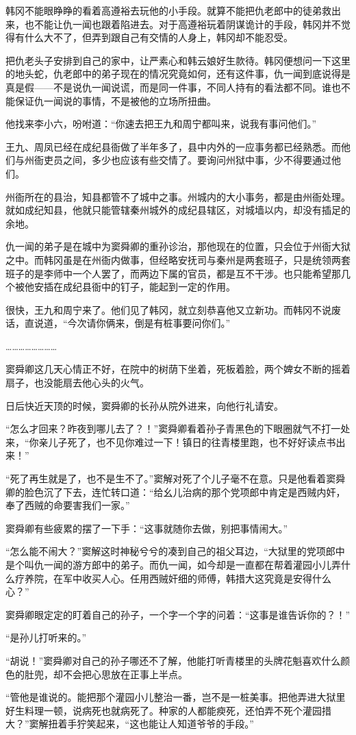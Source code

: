 韩冈不能眼睁睁的看着高遵裕去玩他的小手段。就算不能把仇老郎中的徒弟救出来，也不能让仇一闻也跟着陷进去。对于高遵裕玩着阴谋诡计的手段，韩冈并不觉得有什么大不了，但弄到跟自己有交情的人身上，韩冈却不能忍受。

把仇老头子安排到自己的家中，让严素心和韩云娘好生款待。韩冈便想问一下这里的地头蛇，仇老郎中的弟子现在的情况究竟如何，还有这件事，仇一闻到底说得是真是假——不是说仇一闻说谎，而是同一件事，不同人持有的看法都不同。谁也不能保证仇一闻说的事情，不是被他的立场所扭曲。

他找来李小六，吩咐道：“你速去把王九和周宁都叫来，说我有事问他们。”

王九、周凤已经在成纪县衙做了半年多了，县中内外的一应事务都已经熟悉。而他们与州衙吏员之间，多少也应该有些交情了。要询问州狱中事，少不得要通过他们。

州衙所在的县治，知县都管不了城中之事。州城内的大小事务，都是由州衙处理。就如成纪知县，他就只能管辖秦州城外的成纪县辖区，对城墙以内，却没有插足的余地。

仇一闻的弟子是在城中为窦舜卿的重孙诊治，那他现在的位置，只会位于州衙大狱之中。而韩冈虽是在州衙内做事，但经略安抚司与秦州是两套班子，只是统领两套班子的是李师中一个人罢了，而两边下属的官员，都是互不干涉。也只能希望那几个被他安插在成纪县衙中的钉子，能起到一定的作用。

很快，王九和周宁来了。他们见了韩冈，就立刻恭喜他又立新功。而韩冈不说废话，直说道，“今次请你俩来，倒是有桩事要问你们。”

……………………

窦舜卿这几天心情正不好，在院中的树荫下坐着，死板着脸，两个婢女不断的摇着扇子，也没能扇去他心头的火气。

日后快近天顶的时候，窦舜卿的长孙从院外进来，向他行礼请安。

“怎么才回来？昨夜到哪儿去了？！”窦舜卿看着孙子青黑色的下眼圈就气不打一处来，“你亲儿子死了，也不见你难过一下！镇日的往青楼里跑，也不好好读点书出来！”

“死了再生就是了，也不是生不了。”窦解对死了个儿子毫不在意。只是他看着窦舜卿的脸色沉了下去，连忙转口道：“给幺儿治病的那个党项郎中肯定是西贼内奸，奉了西贼的命要害我们一家。”

窦舜卿有些疲累的摆了一下手：“这事就随你去做，别把事情闹大。”

“怎么能不闹大？”窦解这时神秘兮兮的凑到自己的祖父耳边，“大狱里的党项郎中是个叫仇一闻的游方郎中的弟子。而仇一闻，如今却是一直都在帮着灌园小儿弄什么疗养院，在军中收买人心。任用西贼奸细的师傅，韩措大这究竟是安得什么心？”

窦舜卿眼定定的盯着自己的孙子，一个字一个字的问着：“这事是谁告诉你的？！”

“是孙儿打听来的。”

“胡说！”窦舜卿对自己的孙子哪还不了解，他能打听青楼里的头牌花魁喜欢什么颜色的肚兜，却不会把心思放在正事上半点。

“管他是谁说的。能把那个灌园小儿整治一番，岂不是一桩美事。把他弄进大狱里好生料理一顿，说病死也就病死了。种家的人都能瘐死，还怕弄不死个灌园措大？”窦解扭着手狞笑起来，“这也能让人知道爷爷的手段。”

